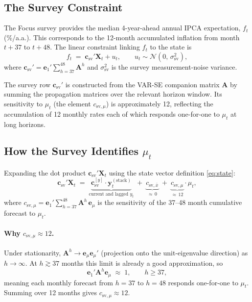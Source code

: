 \documentclass[12pt, a4paper]{article}
\newcommand{\bs}[1]{\boldsymbol{#1}}
\begin{document}
\subsection{The Survey Constraint}

The Focus survey provides the median 4-year-ahead annual IPCA expectation,
$f_t$ (\%/a.a.). This corresponds to the 12-month accumulated inflation from
month $t+37$ to $t+48$. The linear constraint linking $f_t$ to the state
is
\begin{equation}
    f_t \;=\; \bs{c}_{\mathrm{sv}}'\bs{X}_t + u_t,
    \qquad u_t \sim \mathcal{N}(0,\,\sigma^2_{\mathrm{sv}}),
    \label{eq:survey}
\end{equation}
where $\bs{c}_{\mathrm{sv}}' = \bs{e}_1'\sum_{h=37}^{48}\bs{A}^h$ and
$\sigma^2_{\mathrm{sv}}$ is the survey measurement-noise variance.

The survey row $\bs{c}_{\mathrm{sv}}'$ is constructed from the VAR-SE
companion matrix $\bs{A}$ by summing the propagation matrices over the
relevant horizon window. Its sensitivity to $\mu_t$ (the element
$c_{\mathrm{sv},\mu}$) is approximately 12, reflecting the accumulation
of 12 monthly rates each of which responds one-for-one to $\mu_t$ at
long horizons.

\subsection{How the Survey Identifies \texorpdfstring{$\mu_t$}{mu\_t}}
\label{sec:survey_id}

Expanding the dot product $\bs{c}_{\mathrm{sv}}'\bs{X}_t$ using the state
vector definition \eqref{eq:state}:
\begin{equation}
    \bs{c}_{\mathrm{sv}}'\bs{X}_t
    \;=\;
    \underbrace{\bs{c}_{\mathrm{sv}}^{[y]}\cdot \bs{y}_t^{(\mathrm{stack})}}_{\text{current and lagged }y_t}
    \;+\;
    \underbrace{c_{\mathrm{sv},\bar{x}}}_{\approx\,0}
    \;+\;
    \underbrace{c_{\mathrm{sv},\mu}}_{\approx\,12}
    \cdot\mu_t,
    \label{eq:survey_expand}
\end{equation}
where $c_{\mathrm{sv},\mu} = \bs{e}_1'\sum_{h=37}^{48}\bs{A}^h\,\bs{e}_\mu$
is the sensitivity of the 37--48 month cumulative forecast to $\mu_t$.

\paragraph{Why $c_{\mathrm{sv},\mu}\approx 12$.}
Under stationarity, $\bs{A}^h \to \bs{e}_\mu\bs{e}_\mu'$ (projection onto
the unit-eigenvalue direction) as $h\to\infty$. At $h \gtrsim 37$ months
this limit is already a good approximation, so
\begin{equation}
    \bs{e}_1'\bs{A}^h\bs{e}_\mu \;\approx\; 1,
    \qquad h \geq 37,
    \label{eq:attenuation}
\end{equation}
meaning each monthly forecast from $h=37$ to $h=48$ responds one-for-one to
$\mu_t$. Summing over 12 months gives $c_{\mathrm{sv},\mu}\approx 12$.
\end{document}

